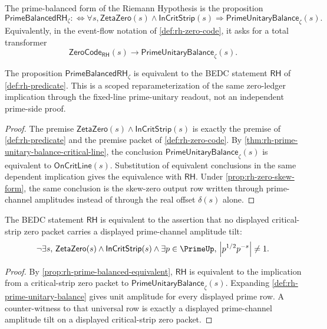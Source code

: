 \begin{definition}
\label{def:rh-prime-balanced-rh}
The prime-balanced form of the Riemann Hypothesis is the proposition
$$
\mathsf{PrimeBalancedRH}_{\zeta}
:\Longleftrightarrow
\forall s,
\mathsf{ZetaZero}(s)\wedge\mathsf{InCritStrip}(s)
\Longrightarrow
\mathsf{PrimeUnitaryBalance}_{\zeta}(s).
$$
Equivalently, in the event-flow notation of
\autoref{def:rh-zero-code}, it asks for a total transformer
$$
\mathsf{ZeroCode}_{\mathsf{RH}}(s)
\to
\mathsf{PrimeUnitaryBalance}_{\zeta}(s).
$$
\end{definition}

\begin{proposition}
\label{prop:rh-prime-balanced-equivalent}
The proposition $\mathsf{PrimeBalancedRH}_{\zeta}$ is equivalent to the BEDC
statement $\mathsf{RH}$ of \autoref{def:rh-predicate}. This is a scoped
reparameterization of the same zero-ledger implication through the fixed-line
prime-unitary readout, not an independent prime-side proof.
\end{proposition}

\begin{proof}
The premise
$\mathsf{ZetaZero}(s)\wedge\mathsf{InCritStrip}(s)$ is exactly the premise of
\autoref{def:rh-predicate} and the premise packet of
\autoref{def:rh-zero-code}.  By
\autoref{thm:rh-prime-unitary-balance-critical-line}, the conclusion
$\mathsf{PrimeUnitaryBalance}_{\zeta}(s)$ is equivalent to
$\mathsf{OnCritLine}(s)$.  Substitution of equivalent conclusions in the same
dependent implication gives the equivalence with $\mathsf{RH}$.  Under
\autoref{prop:rh-zero-skew-form}, the same conclusion is the skew-zero output
row written through prime-channel amplitudes instead of through the real
offset $\delta(s)$ alone.
\end{proof}

\begin{corollary}
\label{cor:rh-no-prime-amplitude-tilt-form}
The BEDC statement $\mathsf{RH}$ is equivalent to the assertion that no
displayed critical-strip zero packet carries a displayed prime-channel
amplitude tilt:
$$
\neg\exists s,\,
\mathsf{ZetaZero}(s)\wedge\mathsf{InCritStrip}(s)\wedge
\exists p\in\PrimeUp,\,
\left|p^{1/2}p^{-s}\right|\neq 1.
$$
\end{corollary}

\begin{proof}
By \autoref{prop:rh-prime-balanced-equivalent}, $\mathsf{RH}$ is equivalent to
the implication from a critical-strip zero packet to
$\mathsf{PrimeUnitaryBalance}_{\zeta}(s)$.  Expanding
\autoref{def:rh-prime-unitary-balance} gives unit amplitude for every
displayed prime row.  A counter-witness to that universal row is exactly a
displayed prime-channel amplitude tilt on a displayed critical-strip zero
packet.
\end{proof}

